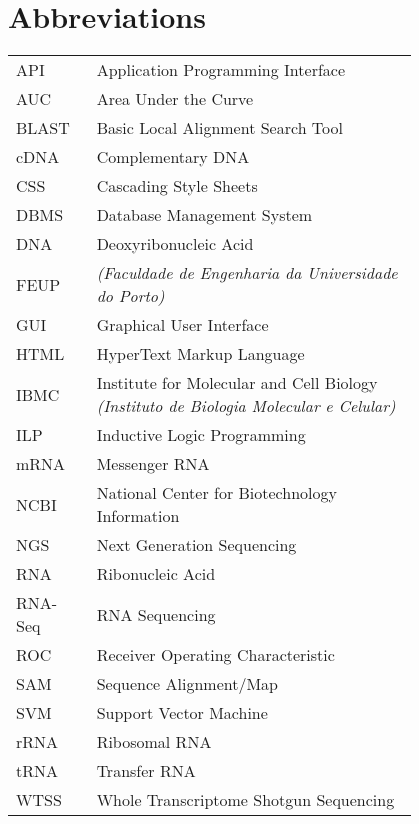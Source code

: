 \chapter*{Abbreviations}

\begin{flushleft}
\begin{tabular}{l p{0.8\linewidth}}
API       & Application Programming Interface\\
AUC       & Area Under the Curve\\
BLAST     & Basic Local Alignment Search Tool\\
cDNA      & Complementary DNA\\
CSS       & Cascading Style Sheets\\
DBMS      & Database Management System\\
DNA       & Deoxyribonucleic Acid\\
FEUP      & \Feup{} \textit{(Faculdade de Engenharia da Universidade do Porto)}\\
GUI       & Graphical User Interface\\
HTML      & HyperText Markup Language\\
IBMC      & Institute for Molecular and Cell Biology \textit{(Instituto de Biologia Molecular e Celular)}\\
ILP       & Inductive Logic Programming\\
mRNA      & Messenger RNA\\
NCBI      & National Center for Biotechnology Information\\
NGS       & Next Generation Sequencing\\
RNA       & Ribonucleic Acid\\
RNA-Seq   & RNA Sequencing\\
ROC       & Receiver Operating Characteristic\\
SAM       & Sequence Alignment/Map\\
SVM       & Support Vector Machine\\
rRNA      & Ribosomal RNA\\
tRNA      & Transfer RNA\\
WTSS      & Whole Transcriptome Shotgun Sequencing\\
\end{tabular}
\end{flushleft}

